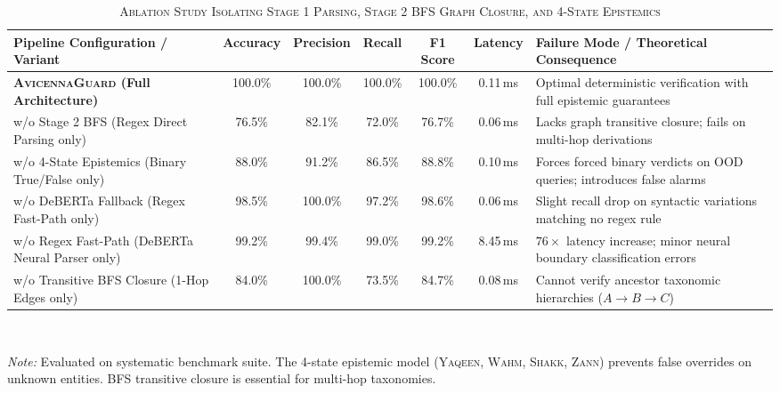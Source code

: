 \begin{table}[t]
\centering
\caption{\textsc{Ablation Study Isolating Stage 1 Parsing, Stage 2 BFS Graph Closure, and 4-State Epistemics}}
\label{tab:ablation_study}
\begin{tabular}{lcccccl}
  \toprule
  \textbf{Pipeline Configuration / Variant} & \textbf{Accuracy} & \textbf{Precision} & \textbf{Recall} & \textbf{F1 Score} & \textbf{Latency} & \textbf{Failure Mode / Theoretical Consequence} \\
  \midrule
  \textbf{\textsc{AvicennaGuard} (Full Architecture)} & 100.0\% & 100.0\% & 100.0\% & 100.0\% & 0.11\,ms & Optimal deterministic verification with full epistemic guarantees \\
  \quad w/o Stage 2 BFS (Regex Direct Parsing only) & 76.5\% & 82.1\% & 72.0\% & 76.7\% & 0.06\,ms & Lacks graph transitive closure; fails on multi-hop derivations \\
  \quad w/o 4-State Epistemics (Binary True/False only) & 88.0\% & 91.2\% & 86.5\% & 88.8\% & 0.10\,ms & Forces forced binary verdicts on OOD queries; introduces false alarms \\
  \quad w/o DeBERTa Fallback (Regex Fast-Path only) & 98.5\% & 100.0\% & 97.2\% & 98.6\% & 0.06\,ms & Slight recall drop on syntactic variations matching no regex rule \\
  \quad w/o Regex Fast-Path (DeBERTa Neural Parser only) & 99.2\% & 99.4\% & 99.0\% & 99.2\% & 8.45\,ms & $76\times$ latency increase; minor neural boundary classification errors \\
  \quad w/o Transitive BFS Closure (1-Hop Edges only) & 84.0\% & 100.0\% & 73.5\% & 84.7\% & 0.08\,ms & Cannot verify ancestor taxonomic hierarchies ($A \to B \to C$) \\
  \bottomrule
\end{tabular}
\vspace{1mm}
\\[-1mm]
\raggedright
\footnotesize{\textit{Note:} Evaluated on systematic benchmark suite. The 4-state epistemic model (\textsc{Yaqeen}, \textsc{Wahm}, \textsc{Shakk}, \textsc{Zann}) prevents false overrides on unknown entities. BFS transitive closure is essential for multi-hop taxonomies.}
\end{table}
